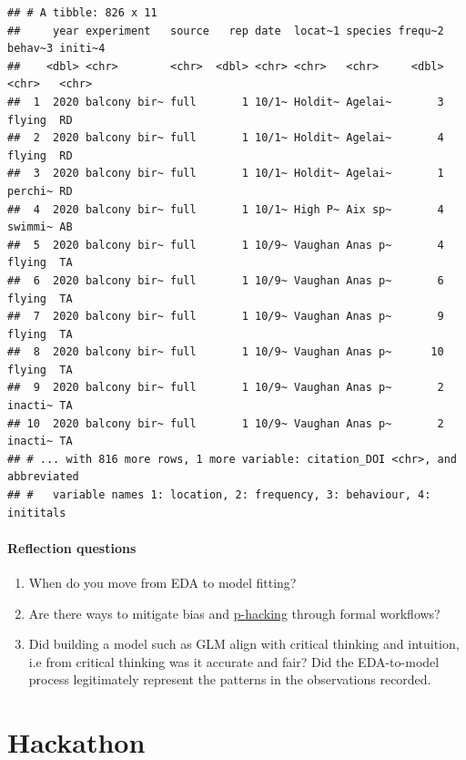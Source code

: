 \documentclass[
]{book}
\providecommand{\tightlist}{%
  \setlength{\itemsep}{0pt}\setlength{\parskip}{0pt}}
\begin{document}
\begin{verbatim}
## # A tibble: 826 x 11
##     year experiment   source   rep date  locat~1 species frequ~2 behav~3 initi~4
##    <dbl> <chr>        <chr>  <dbl> <chr> <chr>   <chr>     <dbl> <chr>   <chr>  
##  1  2020 balcony bir~ full       1 10/1~ Holdit~ Agelai~       3 flying  RD     
##  2  2020 balcony bir~ full       1 10/1~ Holdit~ Agelai~       4 flying  RD     
##  3  2020 balcony bir~ full       1 10/1~ Holdit~ Agelai~       1 perchi~ RD     
##  4  2020 balcony bir~ full       1 10/1~ High P~ Aix sp~       4 swimmi~ AB     
##  5  2020 balcony bir~ full       1 10/9~ Vaughan Anas p~       4 flying  TA     
##  6  2020 balcony bir~ full       1 10/9~ Vaughan Anas p~       6 flying  TA     
##  7  2020 balcony bir~ full       1 10/9~ Vaughan Anas p~       9 flying  TA     
##  8  2020 balcony bir~ full       1 10/9~ Vaughan Anas p~      10 flying  TA     
##  9  2020 balcony bir~ full       1 10/9~ Vaughan Anas p~       2 inacti~ TA     
## 10  2020 balcony bir~ full       1 10/9~ Vaughan Anas p~       2 inacti~ TA     
## # ... with 816 more rows, 1 more variable: citation_DOI <chr>, and abbreviated
## #   variable names 1: location, 2: frequency, 3: behaviour, 4: inititals
\end{verbatim}

\hypertarget{reflection-questions-3}{%
\subsubsection*{Reflection questions}\label{reflection-questions-3}}

\begin{enumerate}
\def\labelenumi{\arabic{enumi}.}
\tightlist
\item
  When do you move from EDA to model fitting?\\
\item
  Are there ways to mitigate bias and \href{https://www.wired.com/story/were-all-p-hacking-now/}{p-hacking} through formal workflows?\\
\item
  Did building a model such as GLM align with critical thinking and intuition, i.e from critical thinking was it accurate and fair? Did the EDA-to-model process legitimately represent the patterns in the observations recorded.
\end{enumerate}

\hypertarget{hackathon}{%
\chapter{Hackathon}\label{hackathon}}
\end{document}
